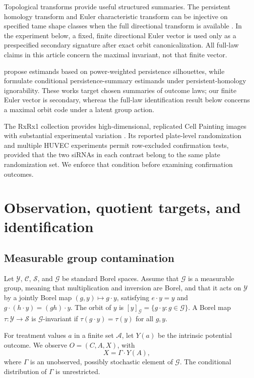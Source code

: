 \documentclass[11pt]{article}
\theoremstyle{definition}
\theoremstyle{remark}
\newcommand{\cY}{\mathcal Y}
\newcommand{\cC}{\mathcal C}
\newcommand{\cS}{\mathcal S}
\newcommand{\cG}{\mathcal G}
\newcommand{\1}{\mathbf 1}
\begin{document}
Topological transforms provide useful structured summaries.  The persistent
homology transform and Euler characteristic transform can be injective on
specified tame shape classes when the full directional transform is available
\citep{turner2014persistent,curry2022directions}.  In the experiment below, a
fixed, finite directional Euler vector is used only as a prespecified secondary
signature after exact orbit canonicalization.  All full-law claims in this
article concern the maximal invariant, not that finite vector.

\citet{kim2026topological} propose estimands based on power-weighted persistence
silhouettes, while \citet{saki2026beyond} formulate conditional
persistence-summary estimands under persistent-homology ignorability.  These
works target chosen summaries of outcome laws; our finite Euler vector is
secondary, whereas the full-law identification result below concerns a maximal
orbit code under a latent group action.

The RxRx1 collection provides high-dimensional, replicated Cell Painting
images with substantial experimental variation
\citep{sypetkowski2023rxrx1,rxrx1website}.  Its reported plate-level randomization and
multiple HUVEC experiments permit row-excluded confirmation tests, provided that
the two siRNAs in each contrast belong to the same plate randomization set.  We
enforce that condition before examining confirmation outcomes.

\section{Observation, quotient targets, and identification}

\subsection{Measurable group contamination}

Let \(\cY\), \(\cC\), \(\cS\), and \(\cG\) be standard Borel spaces.  Assume
that \(\cG\) is a measurable group, meaning that multiplication and inversion
are Borel, and that it acts on \(\cY\) by a jointly Borel map
\((g,y)\mapsto g\cdot y\), satisfying \(e\cdot y=y\) and
\(g\cdot(h\cdot y)=(gh)\cdot y\).  The orbit of \(y\) is
\([y]_{\cG}=\{g\cdot y:g\in\cG\}\).  A Borel map
\(\tau:\cY\to\cS\) is \(\cG\)-invariant if
\(\tau(g\cdot y)=\tau(y)\) for all \(g,y\).

For treatment values \(a\) in a finite set \(\mathcal A\), let \(Y(a)\) be the
intrinsic potential outcome.  We observe \(O=(C,A,X)\), with
\[
  X=\Gamma\cdot Y(A),
\]
where \(\Gamma\) is an unobserved, possibly stochastic element of \(\cG\).
The conditional distribution of \(\Gamma\) is unrestricted.
\end{document}
